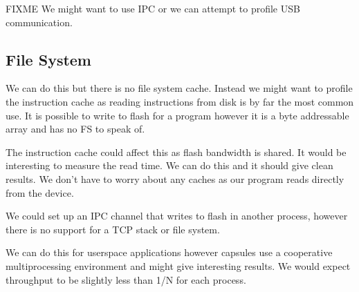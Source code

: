 \documentclass{article}
\begin{document}

FIXME We might want to use IPC or we can attempt to profile USB communication.

\subsection{File System}
We can do this but there is no file system cache. Instead we might want to profile the instruction cache as reading instructions from disk is by far the most common use. It is possible to write to flash for a program however it is a byte addressable array and has no FS to speak of.

The instruction cache could affect this as flash bandwidth is shared. It would be interesting to measure the read time. We can do this and it should give clean results. We don't have to worry about any caches as our program reads directly from the device.

We could set up an IPC channel that writes to flash in another process, however there is no support for a TCP stack or file system.


We can do this for userspace applications however capsules use a cooperative multiprocessing environment and might give interesting results. We would expect throughput to be slightly less than 1/N for each process. 

\printbibliography
\end{document}
